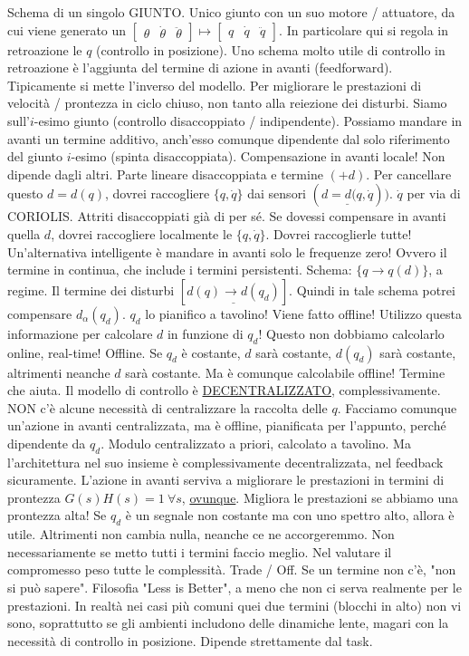 Schema di un singolo GIUNTO. Unico giunto con un suo motore / attuatore, da cui viene generato un $\begin{bmatrix}\theta&\dot{\theta}&\ddot{\theta}\end{bmatrix}\mapsto\begin{bmatrix}q&\dot{q}&\ddot{q}\end{bmatrix}$. In particolare qui si regola in retroazione le $q$ (controllo in posizione). Uno schema molto utile di controllo in retroazione è l'aggiunta del termine di azione in avanti (feedforward). Tipicamente si mette l'inverso del modello. Per migliorare le prestazioni di velocità / prontezza in ciclo chiuso, non tanto alla reiezione dei disturbi. Siamo sull'$i$-esimo giunto (controllo disaccoppiato / indipendente). Possiamo mandare in avanti un termine additivo, anch'esso comunque dipendente dal solo riferimento del giunto $i$-esimo (spinta disaccoppiata). Compensazione in avanti locale! Non dipende dagli altri. Parte lineare disaccoppiata e termine $(+d)$. Per cancellare questo $d=d(q)$, dovrei raccogliere $\{q,\dot{q}\}$ dai sensori $(\underline{d=d(q,\dot{q}}))$. $\dot{q}$ per via di CORIOLIS. Attriti disaccoppiati già di per sé. Se dovessi compensare in avanti quella $d$, dovrei raccogliere localmente le $\{q,\dot{q}\}$. Dovrei raccoglierle tutte! Un'alternativa intelligente è mandare in avanti solo le frequenze zero! Ovvero il termine in continua, che include i termini persistenti. Schema: $\{q\to q(d)\}$, a regime. Il termine dei disturbi $[\underline{d(q)\to d(q_d)}]$. Quindi in tale schema potrei compensare $d_\alpha(q_d)$. $q_d$ lo pianifico a tavolino! Viene fatto offline! Utilizzo questa informazione per calcolare $d$ in funzione di $q_d$! Questo non dobbiamo calcolarlo online, real-time! Offline. Se $q_d$ è costante, $d$ sarà costante, $d(q_d)$ sarà costante, altrimenti neanche $d$ sarà costante. Ma è comunque calcolabile offline! Termine che aiuta. Il modello di controllo è \underline{DECENTRALIZZATO}, complessivamente. NON c'è alcune necessità di centralizzare la raccolta delle $q$. Facciamo comunque un'azione in avanti centralizzata, ma è offline, pianificata per l'appunto, perché dipendente da $q_d$. Modulo centralizzato a priori, calcolato a tavolino. Ma l'architettura nel suo insieme è complessivamente decentralizzata, nel feedback sicuramente. L'azione in avanti serviva a migliorare le prestazioni in termini di prontezza $G(s)H(s)=1\ \forall s$, \underline{ovunque}. Migliora le prestazioni se abbiamo una prontezza alta! Se $q_d$ è un segnale non costante ma con uno spettro alto, allora è utile. Altrimenti non cambia nulla, neanche ce ne accorgeremmo. Non necessariamente se metto tutti i termini faccio meglio. Nel valutare il compromesso peso tutte le complessità. Trade / Off. Se un termine non c'è, "non si può sapere". Filosofia "Less is Better", a meno che non ci serva realmente per le prestazioni. In realtà nei casi più comuni quei due termini (blocchi in alto) non vi sono, soprattutto se gli ambienti includono delle dinamiche lente, magari con la necessità di controllo in posizione. Dipende strettamente dal task.


